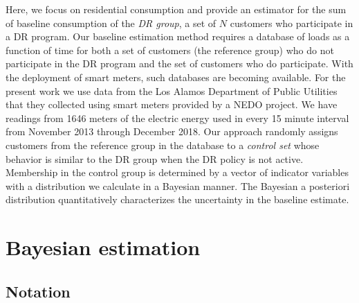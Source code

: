 \documentclass[journal]{IEEEtran}
\begin{document}
Here, we focus on residential consumption and provide an estimator for
the sum of baseline consumption of the \emph{DR group}, a set of $N$
customers who participate in a DR program.  Our baseline estimation
method requires a database of loads as a function of time for both a
set of customers (the reference group) who do not participate in the
DR program and the set of customers who do participate.  With the
deployment of smart meters, such databases are becoming available.
For the present work we use data from the Los Alamos Department of
Public Utilities that they collected using smart meters provided by a
NEDO project\cite{nedo}.  We have readings from 1646 meters of the
electric energy used in every 15 minute interval from November 2013
through December 2018.  Our approach randomly assigns customers from
the reference group in the database to a \emph{control set} whose
behavior is similar to the DR group when the DR policy is not active.
Membership in the control group is determined by a vector of indicator
variables with a distribution we calculate in a Bayesian manner.  The
Bayesian a posteriori distribution quantitatively characterizes the
uncertainty in the baseline estimate.

\section{Bayesian estimation}
\label{sec:new}

\subsection{Notation}
\label{sec:notation}
\end{document}
